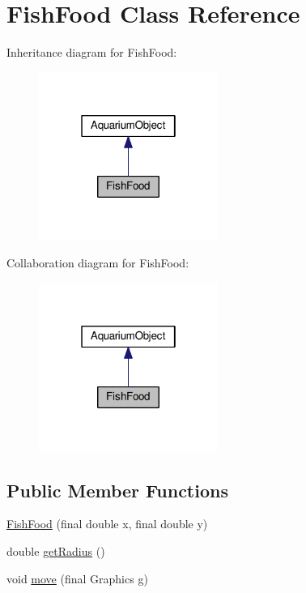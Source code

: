 \hypertarget{class_fish_food}{}\section{Fish\+Food Class Reference}
\label{class_fish_food}


Inheritance diagram for Fish\+Food\+:
\nopagebreak
\begin{figure}[H]
\begin{center}
\leavevmode
\includegraphics[width=166pt]{class_fish_food__inherit__graph}
\end{center}
\end{figure}


Collaboration diagram for Fish\+Food\+:
\nopagebreak
\begin{figure}[H]
\begin{center}
\leavevmode
\includegraphics[width=166pt]{class_fish_food__coll__graph}
\end{center}
\end{figure}
\subsection*{Public Member Functions}
\begin{DoxyCompactItemize}
\item 
\mbox{\hyperlink{class_fish_food_aa3c6283b8dcbf8fc6343051bb2cbb522}{Fish\+Food}} (final double x, final double y)
\item 
double \mbox{\hyperlink{class_fish_food_a2b498cda505d338c12ef59f7d4746325}{get\+Radius}} ()
\item 
void \mbox{\hyperlink{class_fish_food_a0e72b850cf4211a1613e0376bf2d286e}{move}} (final Graphics g)
\end{DoxyCompactItemize}
